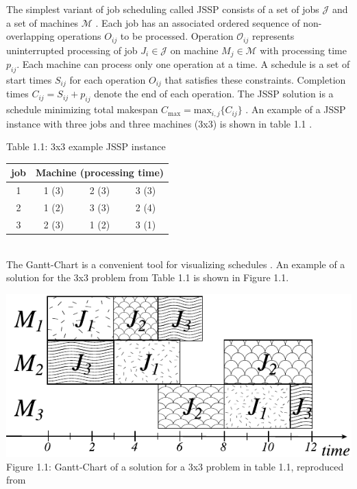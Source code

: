 The simplest variant of job scheduling called JSSP consists of a set of jobs $\mathcal{J}$ and a set of machines $\mathcal{M}$ \cite{YamadaNakanoJSSP}. Each job has an associated ordered sequence of non-overlapping operations $O_{ij}$ to be processed. Operation $\mathcal{O}_{ij}$ represents uninterrupted processing of job $J_i \in \mathcal{J}$ on machine $M_j \in \mathcal{M}$ with processing time $p_{ij}$. Each machine can process only one operation at a time. A schedule is a set of start times $S_{ij}$ for each operation $O_{ij}$ that satisfies these constraints. Completion times $C_{ij} = S_{ij} + p_{ij}$ denote the end of each operation. The JSSP solution is a schedule minimizing total makespan $C_\text{max} = \text{max}_{i,j} \{C_{ij}\}$ \cite{zhang2020learning}. An example of a JSSP instance with three jobs and three machines (3x3) is shown in table 1.1 \cite{YamadaNakanoJSSP}.
\begin{table}[htbp]
    Table 1.1: 3x3 example JSSP instance \cite{YamadaNakanoJSSP}\\
    \vspace{1mm}
    \begin{tabular}{cccc}
    \hline
    job & \multicolumn{3}{c}{Machine (processing time)} \\ \hline
    1   & 1 (3)             & 2 (3)             & 3 (3)            \\
    2   & 1 (2)             & 3 (3)             & 2 (4)            \\
    3   & 2 (3)             & 1 (2)             & 3 (1)            \\ \hline
    \end{tabular}
\end{table}\\
The Gantt-Chart is a convenient tool for visualizing schedules \cite{WILSON2003430}. An example of a solution for the 3x3 problem from Table 1.1 is shown in Figure 1.1.
\begin{center}
    \includegraphics[width=0.8\linewidth]{images/gantt-charrt.pdf}\\
    Figure 1.1: Gantt-Chart of a solution for a 3x3 problem in table 1.1, reproduced from \cite{YamadaNakanoJSSP}
\end{center}

